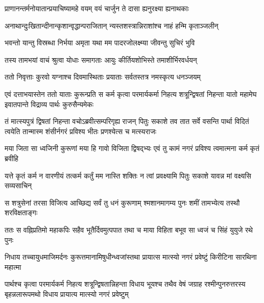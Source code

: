 \twolineshloka
{प्राणानन्तर्मनोयातान्प्रयाचिष्यामहे वयम्}
{वयं चार्जुन ते दासा ह्यनुरक्ष्या ह्यनाथकाः}




\twolineshloka
{अनाथान्दुःखितान्दीनान्कृशान्वृद्धान्पराजितान्}
{न्यस्तशस्त्रान्निराशांश्च नाहं हन्मि कृताञ्जलीन्}


\twolineshloka
{भवन्तो यान्तु विस्रब्धा निर्भया अमृता यथा}
{मम पादरजोलक्ष्म्या जीवन्तु सुचिरं भुवि}


\twolineshloka
{तस्य तामभयां वाचं श्रुत्वा योधाः समागताः}
{आयुः कीर्तियशोभिस्ते तमाशीर्भिरवर्धयन्}


\twolineshloka
{ततो निवृत्ताः कुरवो यग्नाश्च दिवमास्थिताः}
{प्रयाताः सर्वतस्तत्र नमस्कृत्य धनञ्जयम्}


\onelineshloka
{एवं दत्ताभयास्तेन ततो याताः कुरून्प्रति}
\twolineshloka
{स कर्म कृत्वा परमार्यकर्मा निहत्य शत्रून्द्विषतां निहन्ता}
{यातो महामेघ इवातपान्ते विद्राव्य पार्थः कुरुसैन्यमेकः}


\onelineshloka
{तं मात्स्यपुत्रं द्विषतां निहन्ता वचोऽब्रवीत्सम्परिगृह्य राजन्}
\twolineshloka
{पितुः सकाशे तव तात सर्वे वसन्ति पार्था विदितं त्वयेति}
{तान्मास्म शंसीर्नगरं प्रविश्य भीतः प्रणश्येत्स च मत्स्यराजः}


\twolineshloka
{मया जिता सा ध्वजिनी कुरूणां मया हि गावो विजिता द्विषद्भ्यः}
{एवं तु कामं नगरं प्रविश्य त्वमात्मना कर्म कृतं ब्रवीहि}




\twolineshloka
{यत्ते कृतं कर्म न वारणीयं तत्कर्म कर्तुं मम नास्ति शक्तिः}
{न त्वां प्रवक्ष्यामि पितुः सकाशे यावन्न मां वक्ष्यसि सव्यसाचिन्}




\twolineshloka
{स शत्रुसेनां तरसा विजित्य आच्छिद्य सर्वं तु धनं कुरूणाम्}
{श्मशानमागम्य पुनः शमीं तामभ्येत्य तस्थौ शरविक्षताङ्गः}


\twolineshloka
{ततः स वह्निप्रतिमो महाकपिः सहैव भूतैर्दिवमुत्पपात}
{तथा च माया विहिता बभूव सा ध्वजं च सिंहं युयुजे रथे पुनः}


\twolineshloka
{निधाय तच्चायुधमाजिमर्दनः कुरूत्तमानामिषुधीन्ध्वजांस्तथा}
{प्रायात्स मात्स्यो नगरं प्रवेष्टुं किरीटिना सारथिना महात्मा}


\threelineshloka
{पार्थश्च कृत्वा परमार्यकर्म निहत्य शत्रून्द्विषतान्निहन्ता}
{विधाय भूयश्च तथैव वेषं जग्राह रश्मीन्पुनरुत्तरस्य}
{बृहन्नलारूपमथो विधाय प्रायात्य मात्स्यो नगरं प्रवेष्टुम्}


